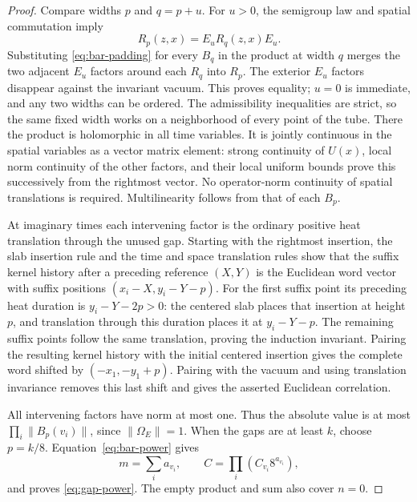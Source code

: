 \begin{proof}
Compare widths $p$ and $q=p+u$. For $u>0$, the semigroup law and spatial
commutation imply
\[
 R_p(z,x)=E_uR_q(z,x)E_u.
\]
Substituting \eqref{eq:bar-padding} for every $B_q$ in the product at width
$q$ merges the two adjacent $E_u$ factors around each $R_q$ into $R_p$.
The exterior $E_u$ factors disappear against the invariant vacuum. This
proves equality; $u=0$ is immediate, and any two widths can be ordered.
The admissibility inequalities are strict, so the same fixed width works on
a neighborhood of every point of the tube. There the product is holomorphic
in all time variables. It is jointly continuous in the spatial variables as
a vector matrix element: strong continuity of $U(x)$, local norm continuity
of the other factors, and their local uniform bounds prove this successively
from the rightmost vector. No operator-norm continuity of spatial
translations is required. Multilinearity follows from that of each $B_p$.

At imaginary times each intervening factor is the ordinary positive heat
translation through the unused gap. Starting with the rightmost insertion,
the slab insertion rule and the time and space translation rules show that
the suffix kernel history after a preceding reference $(X,Y)$ is the Euclidean
word vector with suffix positions $(x_i-X,y_i-Y-p)$. For the first suffix
point its preceding heat duration is $y_i-Y-2p>0$: the centered slab
places that insertion at height $p$, and translation through this duration
places it at $y_i-Y-p$. The remaining suffix points follow the same
translation, proving the induction invariant. Pairing the resulting kernel history
with the initial centered insertion gives the complete word shifted by
$(-x_1,-y_1+p)$. Pairing with the vacuum and using translation invariance
removes this last shift and gives the asserted Euclidean correlation.

All intervening factors have norm at most one. Thus the absolute value is
at most $\prod_i\|B_p(v_i)\|$, since $\|\Omega_E\|=1$. When the gaps are
at least $k$, choose $p=k/8$. Equation~\eqref{eq:bar-power} gives
\[
 m=\sum_i a_{v_i},\qquad C=\prod_i(C_{v_i}8^{a_{v_i}}),
\]
and proves \eqref{eq:gap-power}. The empty product and sum also cover $n=0$.
\end{proof}

